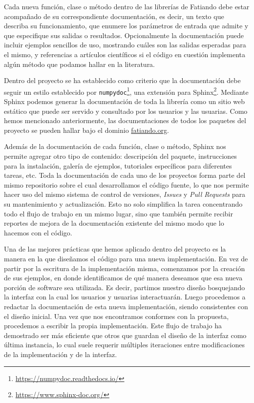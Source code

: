 Cada nueva función, clase o método dentro de las librerías de Fatiando debe
estar acompañado de su correspondiente documentación, es decir, un texto que
describa su funcionamiento, que enumere los parámetros de entrada que admite
y que especifique sus salidas o resultados.
Opcionalmente la documentación puede incluir ejemplos sencillos de uso,
mostrando cuáles son las salidas esperadas para el mismo, y referencias
a artículos científicos si el código en cuestión implementa algún método que
podamos hallar en la literatura.

Dentro del proyecto se ha establecido como criterio que la documentación debe
seguir un estilo establecido por
\texttt{numpydoc}\footnote{\url{https://numpydoc.readthedocs.io/}},
una extensión para Sphinx\footnote{\url{https://www.sphinx-doc.org/}}.
Mediante Sphinx podemos generar la documentación de toda la librería como un
sitio web estático que puede ser servido y consultado por los usuarios y las
usuarias.
Como hemos mencionado anteriormente, las documentaciones de todos los paquetes
del proyecto se pueden hallar bajo el dominio
\href{https://www.fatiando.org}{fatiando.org}.

Además de la documentación de cada función, clase o método, Sphinx nos permite
agregar otro tipo de contenido: descripción del paquete, instrucciones
para la instalación, galería de ejemplos, tutoriales específicos para
diferentes tareas, etc.
Toda la documentación de cada uno de los proyectos forma parte del mismo
repositorio sobre el cual desarrollamos el código fuente, lo que nos permite
hacer uso del mismo sistema de control de versiones, \emph{Issues} y \emph{Pull
Requests} para su mantenimiento y actualización.
Esto no solo simplifica la tarea concentrando todo el flujo de trabajo en un
mismo lugar, sino que también permite recibir reportes de mejora de la
documentación existente del mismo modo que lo hacemos con el código.

Una de las mejores prácticas que hemos aplicado dentro del proyecto es la
manera en la que diseñamos el código para una nueva implementación.
En vez de partir por la escritura de la implementación misma, comenzamos por la
creación de sus ejemplos, en donde identificamos de qué manera deseamos que esa
nueva porción de software sea utilizada.
Es decir, partimos nuestro diseño bosquejando la interfaz con la cual los
usuarios y usuarias interactuarán.
Luego procedemos a redactar la documentación de esta nueva implementación,
siendo consistentes con el diseño inicial.
Una vez que nos encontramos conformes con la propuesta, procedemos a escribir
la propia implementación.
Este flujo de trabajo ha demostrado ser más eficiente que otros que guardan el
diseño de la interfaz como última instancia, lo cual suele requerir múltiples
iteraciones entre modificaciones de la implementación y de la interfaz.


